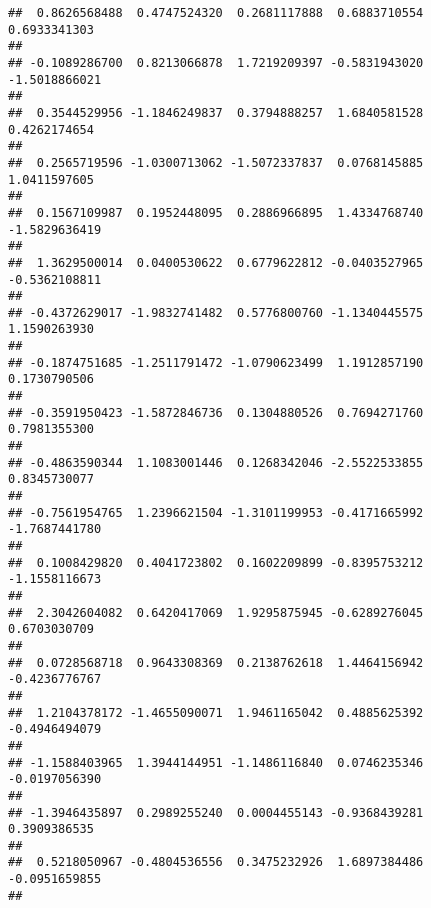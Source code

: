 \documentclass[]{article}
\begin{document}
\begin{verbatim}
##  0.8626568488  0.4747524320  0.2681117888  0.6883710554  0.6933341303 
##                                                                       
## -0.1089286700  0.8213066878  1.7219209397 -0.5831943020 -1.5018866021 
##                                                                       
##  0.3544529956 -1.1846249837  0.3794888257  1.6840581528  0.4262174654 
##                                                                       
##  0.2565719596 -1.0300713062 -1.5072337837  0.0768145885  1.0411597605 
##                                                                       
##  0.1567109987  0.1952448095  0.2886966895  1.4334768740 -1.5829636419 
##                                                                       
##  1.3629500014  0.0400530622  0.6779622812 -0.0403527965 -0.5362108811 
##                                                                       
## -0.4372629017 -1.9832741482  0.5776800760 -1.1340445575  1.1590263930 
##                                                                       
## -0.1874751685 -1.2511791472 -1.0790623499  1.1912857190  0.1730790506 
##                                                                       
## -0.3591950423 -1.5872846736  0.1304880526  0.7694271760  0.7981355300 
##                                                                       
## -0.4863590344  1.1083001446  0.1268342046 -2.5522533855  0.8345730077 
##                                                                       
## -0.7561954765  1.2396621504 -1.3101199953 -0.4171665992 -1.7687441780 
##                                                                       
##  0.1008429820  0.4041723802  0.1602209899 -0.8395753212 -1.1558116673 
##                                                                       
##  2.3042604082  0.6420417069  1.9295875945 -0.6289276045  0.6703030709 
##                                                                       
##  0.0728568718  0.9643308369  0.2138762618  1.4464156942 -0.4236776767 
##                                                                       
##  1.2104378172 -1.4655090071  1.9461165042  0.4885625392 -0.4946494079 
##                                                                       
## -1.1588403965  1.3944144951 -1.1486116840  0.0746235346 -0.0197056390 
##                                                                       
## -1.3946435897  0.2989255240  0.0004455143 -0.9368439281  0.3909386535 
##                                                                       
##  0.5218050967 -0.4804536556  0.3475232926  1.6897384486 -0.0951659855 
##                                                                       

\end{verbatim}
\end{document}
